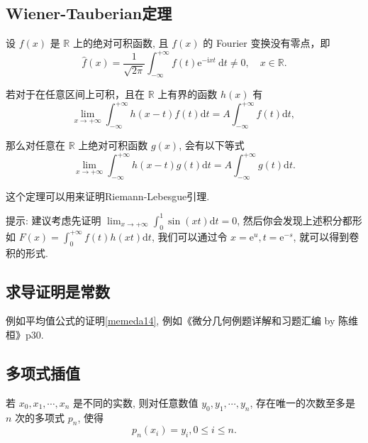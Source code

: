 \subsection{Wiener-Tauberian定理}

\begin{theorem}\label{ Wiener-Tauberian定理}
    设 $f(x)$ 是 $\mathbb{R}$ 上的绝对可积函数, 且 $f(x)$ 的 Fourier 变换没有零点，即
    $$
        \widehat{f}(x)=\frac{1}{\sqrt{2 \pi}} \int_{-\infty}^{+\infty} f(t) \mathrm{e}^{-\mathrm{i} x t} \mathrm{~d} t \neq 0, \quad x \in \mathbb{R} .
    $$

    若对于在任意区间上可积，且在 $\mathbb{R}$ 上有界的函数 $h(x)$ 有
    $$
        \lim _{x \rightarrow+\infty} \int_{-\infty}^{+\infty} h(x-t) f(t) \mathrm{d} t=A \int_{-\infty}^{+\infty} f(t) \mathrm{d} t \text {, }
    $$

    那么对任意在 $\mathbb{R}$ 上绝对可积函数 $g(x)$, 会有以下等式
    $$
        \lim _{x \rightarrow+\infty} \int_{-\infty}^{+\infty} h(x-t) g(t) \mathrm{d} t=A \int_{-\infty}^{+\infty} g(t) \mathrm{d} t .
    $$
\end{theorem}

\begin{note}
    这个定理可以用来证明Riemann-Lebesgue引理.
\end{note}

\begin{remark}
    提示: 建议考虑先证明 $\displaystyle \lim _{x \rightarrow+\infty} \int_0^1 \sin (x t) \mathrm{d} t=0$, 然后你会发现上述积分都形如 $\displaystyle F(x)=\int_0^{+\infty} f(t) h(x t) \mathrm{d} t$, 我们可以通过令 $x=\mathrm{e}^u , t=\mathrm{e}^{-s}$, 就可以得到卷积的形式.
\end{remark}

\subsection{求导证明是常数}

例如平均值公式的证明\cref{memeda14}, 例如《微分几何例题详解和习题汇编 by 陈维桓》p30.

\subsection{多项式插值}

\begin{theorem}
    若 $x_0, x_1, \cdots, x_n$ 是不同的实数, 则对任意数值 $y_0, y_1, \cdots, y_n$, 存在唯一的次数至多是 $n$ 次的多项式 $p_n$, 使得
    $$
        p_n\left(x_i\right)=y_i, 0 \leq i \leq n .
    $$
\end{theorem}

